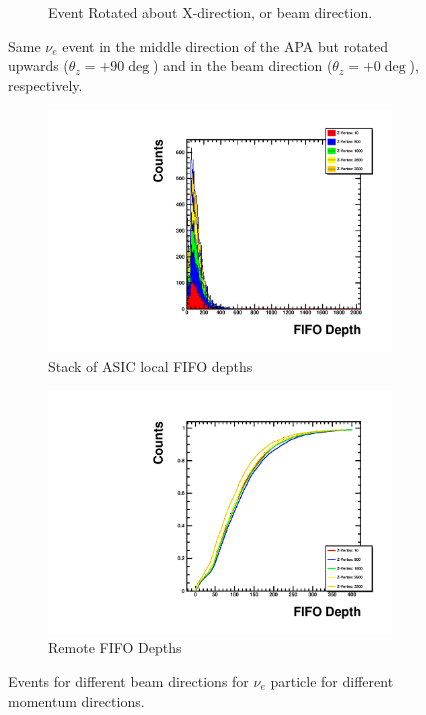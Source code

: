 \begin{figure}
\begin{subfigure}{.5\textwidth}
  \caption{Event Rotated about X-direction, or beam direction.}
\end{subfigure}
\caption{Same $\nu_{e}$ event in the middle direction of the APA but rotated upwards ($\theta_{z} = +90\deg$) and in the beam direction ($\theta_{z} = +0\deg$), respectively.}
\label{fig:compare_integral_nolabel}
\end{figure}
 
\begin{figure}
\centering
\begin{subfigure}{.5\textwidth}
  \centering
  \includegraphics[width=\textwidth]{images/Const_Theta0_ASIC_stack_integral_pdg12_fhc.pdf}
  \caption{Stack of ASIC local FIFO depths}
\end{subfigure}%
\begin{subfigure}{.5\textwidth}
  \centering
  \includegraphics[width=\textwidth]{images/Const_Theta0_ASIC_integral_pdg12_fhc.pdf}
  \caption{Remote FIFO Depths}
\end{subfigure}
\caption{Events for different beam directions for $\nu_{e}$ particle for different momentum directions.}
\label{fig:example_asic_integral_value_constTheta}
\end{figure}



